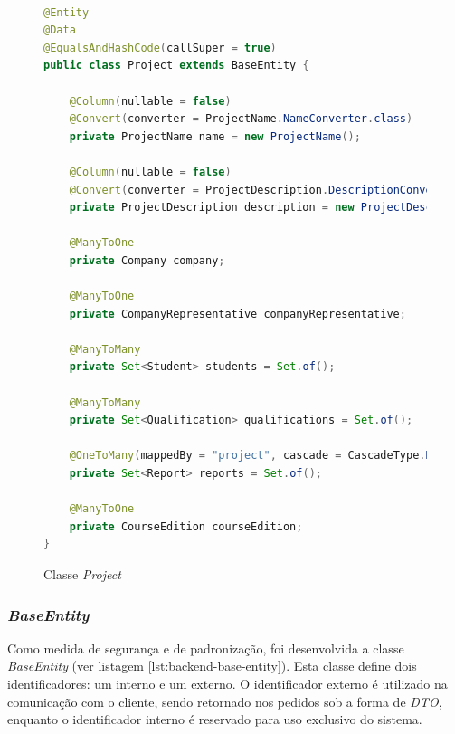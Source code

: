 \begin{figure}
    \centering
    
    \begin{lstlisting}[language=Java]

@Entity
@Data
@EqualsAndHashCode(callSuper = true)
public class Project extends BaseEntity {

    @Column(nullable = false)
    @Convert(converter = ProjectName.NameConverter.class)
    private ProjectName name = new ProjectName();

    @Column(nullable = false)
    @Convert(converter = ProjectDescription.DescriptionConverter.class)
    private ProjectDescription description = new ProjectDescription();

    @ManyToOne
    private Company company;

    @ManyToOne
    private CompanyRepresentative companyRepresentative;

    @ManyToMany
    private Set<Student> students = Set.of();

    @ManyToMany
    private Set<Qualification> qualifications = Set.of();

    @OneToMany(mappedBy = "project", cascade = CascadeType.REMOVE)
    private Set<Report> reports = Set.of();

    @ManyToOne
    private CourseEdition courseEdition;
}

    \end{lstlisting}

    \caption{Classe \textit{Project}}
    \label{fig:classe-projeto}
\end{figure}













\subsubsection{\textit{BaseEntity}}
\label{sec:backend-base-entity}

Como medida de segurança e de padronização, foi desenvolvida a classe \textit{BaseEntity} (ver listagem \ref{lst:backend-base-entity}). Esta classe define dois identificadores: um interno e um externo. O identificador externo é utilizado na comunicação com o cliente, sendo retornado nos pedidos sob a forma de \textit{DTO}, enquanto o identificador interno é reservado para uso exclusivo do sistema.

